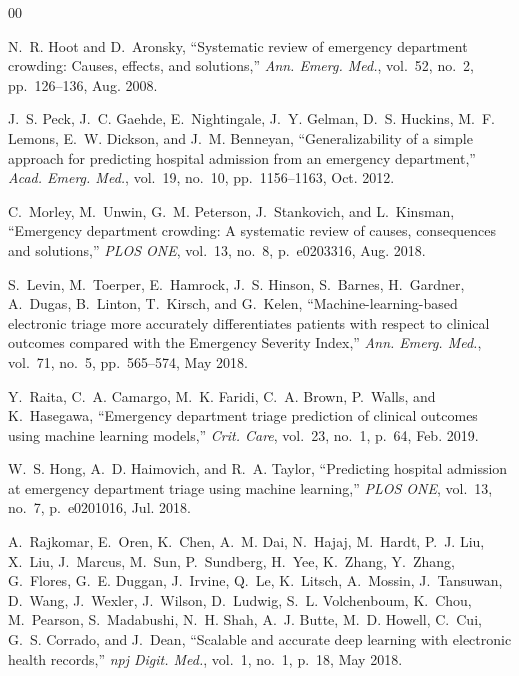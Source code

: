 \documentclass[runningheads]{llncs}
\begin{document}
\begin{thebibliography}{00}

N.~R. Hoot and D.~Aronsky, ``Systematic review of emergency department crowding: Causes, effects, and solutions,'' \textit{Ann. Emerg. Med.}, vol.~52, no.~2, pp.~126--136, Aug. 2008.

J.~S. Peck, J.~C. Gaehde, E.~Nightingale, J.~Y. Gelman, D.~S. Huckins, M.~F. Lemons, E.~W. Dickson, and J.~M. Benneyan, ``Generalizability of a simple approach for predicting hospital admission from an emergency department,'' \textit{Acad. Emerg. Med.}, vol.~19, no.~10, pp.~1156--1163, Oct. 2012.

C.~Morley, M.~Unwin, G.~M. Peterson, J.~Stankovich, and L.~Kinsman, ``Emergency department crowding: A systematic review of causes, consequences and solutions,'' \textit{PLOS ONE}, vol.~13, no.~8, p.~e0203316, Aug. 2018.

S.~Levin, M.~Toerper, E.~Hamrock, J.~S. Hinson, S.~Barnes, H.~Gardner, A.~Dugas, B.~Linton, T.~Kirsch, and G.~Kelen, ``Machine-learning-based electronic triage more accurately differentiates patients with respect to clinical outcomes compared with the Emergency Severity Index,'' \textit{Ann. Emerg. Med.}, vol.~71, no.~5, pp.~565--574, May 2018.

Y.~Raita, C.~A. Camargo, M.~K. Faridi, C.~A. Brown, P.~Walls, and K.~Hasegawa, ``Emergency department triage prediction of clinical outcomes using machine learning models,'' \textit{Crit. Care}, vol.~23, no.~1, p.~64, Feb. 2019.

W.~S. Hong, A.~D. Haimovich, and R.~A. Taylor, ``Predicting hospital admission at emergency department triage using machine learning,'' \textit{PLOS ONE}, vol.~13, no.~7, p.~e0201016, Jul. 2018.

A.~Rajkomar, E.~Oren, K.~Chen, A.~M. Dai, N.~Hajaj, M.~Hardt, P.~J. Liu, X.~Liu, J.~Marcus, M.~Sun, P.~Sundberg, H.~Yee, K.~Zhang, Y.~Zhang, G.~Flores, G.~E. Duggan, J.~Irvine, Q.~Le, K.~Litsch, A.~Mossin, J.~Tansuwan, D.~Wang, J.~Wexler, J.~Wilson, D.~Ludwig, S.~L. Volchenboum, K.~Chou, M.~Pearson, S.~Madabushi, N.~H. Shah, A.~J. Butte, M.~D. Howell, C.~Cui, G.~S. Corrado, and J.~Dean, ``Scalable and accurate deep learning with electronic health records,'' \textit{npj Digit. Med.}, vol.~1, no.~1, p.~18, May 2018.


\end{thebibliography}
\end{document}
